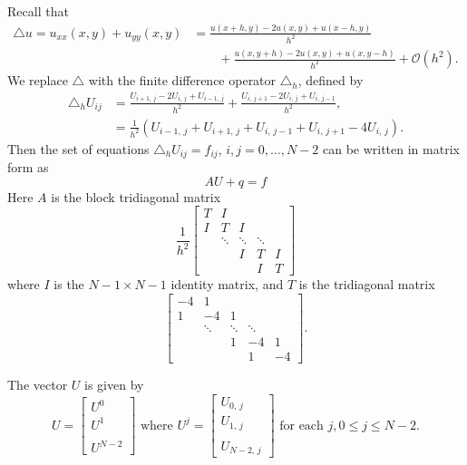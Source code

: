 Recall that 
 \begin{align*}
 \triangle u = u_{xx}(x,y) + u_{yy}(x,y) &= \frac{u(x+h,y) - 2u(x,y)+ u(x-h,y)}{h^2} \\
 & \qquad{}+ 
 \frac{u(x,y+h) - 2u(x,y)+ u(x,y-h)}{h^2} + \mathcal{O}(h^2).
 \end{align*}
 We replace $\triangle $ with the finite difference operator $\triangle_h$, defined by 
 \begin{align*}
 \triangle_h U_{ij} &= \frac{U_{i+1,\,j} - 2U_{i,\,j} + U_{i-1,\,j}}{h^2} + \frac{U_{i,\,j+1} - 2U_{i,\,j}+ U_{i,\,j-1}}{h^2},\\
&= \frac{1}{h^2}(U_{i-1,\,j} + U_{i+1,\,j} + U_{i,\,j-1} + U_{i,\,j+1}-4U_{i,\,j}).
 \end{align*}
 Then the set of equations  $\triangle_h U_{ij} = f_{ij}$, $i,j = 0,\ldots,N-2$ %
can be written in matrix form as
 $$AU + q  = f$$
 Here $A$ is the block tridiagonal matrix 
 \[
 \frac{1}{h^2} \begin{bmatrix}T & I & &  &\\ I &T & I & &\\  &\ddots  & \ddots & \ddots & \\  &  & I & T & I \\
  &  &  & I & T
 \end{bmatrix}
 \]
 where $I$ is the $N-1\times N-1$ %
identity matrix, and $T$ is the tridiagonal matrix
 \[
  \begin{bmatrix}-4 & 1 & &  &\\ 1 &-4 & 1 & &\\  &\ddots  & \ddots & \ddots & \\  &  & 1 & -4 & 1 \\
  &  &  & 1 & -4
 \end{bmatrix}.
 \]

 The vector $U$ is given by 
 \[
 U = \begin{bmatrix} U^0 \\ U^1 \\ \\ U^{N-2} \end{bmatrix} \text{ where } U^j = 
 \begin{bmatrix} U_{0,\,j} \\ U_{1,\,j} \\ \\ U_{N-2,\,j} \end{bmatrix} \text{ for each } j, 0\leq j \leq N-2.
 \]

 

